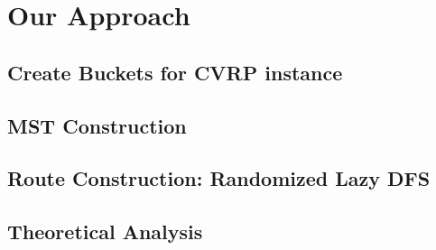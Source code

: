 \section{Our Approach}
\label{sec:approach}






\subsection{Create Buckets for CVRP instance}
\label{subsec:create_buckets}


\subsection{MST Construction}
\label{subsec:construct_mst}


\subsection{Route Construction: Randomized Lazy DFS}
\label{subsec:routes_construction_via_random_DFS}


% 


\subsection{Theoretical Analysis}
\label{subsec::theoretical-analysis}

